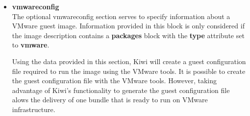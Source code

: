 \begin{itemize}
	\begin{Command}{12cm}
	<split>\\
	\hspace*{1cm}<temporary>\\
	\hspace*{2cm}<!-- read/write access to: -->\\
	\hspace*{2cm}<file name="/var"/>\\
	\hspace*{2cm}<file name="/var/*"/>\\
	\hspace*{2cm}<!-- but not on this file: -->\\
	\hspace*{2cm}<except name="/etc/shadow"/>\\
	\hspace*{1cm}</temporary>\\
	\hspace*{1cm}<persistent>\\
	\hspace*{2cm}<!-- persistent read/write access to: -->\\
	\hspace*{2cm}<file name="/etc"/>\\
	\hspace*{2cm}<file name="/etc/*"/>\\
	\hspace*{2cm}<!-- but not on this file: -->\\
	\hspace*{2cm}<except name="/etc/passwd"/>\\
	\hspace*{1cm}</persistent>\\
	</split>
	\end{Command}

    Use the \textbf{except} element to specify exceptions to previously
    configured rules.

\item \textbf{vmwareconfig}\\
    The optional vmwareconfig section serves to specify information
    about a VMware guest image. Information provided in this block is only
    considered if the image description contains a \textbf{packages} block
    with the \textbf{type} attribute set to \textbf{vmware}.

    Using the data provided in this section, Kiwi will create a guest
    configuration file required to run the image using the VMware tools.
    It is possible to create the guest configuration file with the VMware
    tools. However, taking advantage of Kiwi's functionality to generate
    the guest configuration file alows the delivery of one bundle that is
    ready to run on VMware infrastructure.


\end{itemize}
